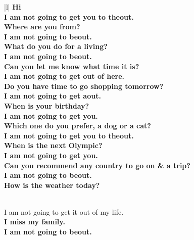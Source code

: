 \documentclass[11pt,a4paper]{article}
\begin{document}
\begin{table}[t!]
\begin{center}
\begin{tabular}{|l|}
\hline \bf 
Hi  \\ 
I am not going to get you to theout.\\
\bf Where are you from?  
\\I am not going to beout.
\\ \bf What do you do for a living?
 \\ I am not going to beout.
\\ \bf Can you let me know what time it is?
 \\I am not going to get out of here.
 \\ \bf Do you have time to go shopping tomorrow?
 \\  I am not going to get aout.
 \\
\bf When is your birthday? \\  
I am not going to get you. \\
\bf Which one do you prefer, a dog or a cat?
\\I am not going to get you to theout. \\
\bf When is the next Olympic?
 \\  I am not going to get you.
 \\
\bf Can you recommend any country to go on & \bf  a trip? 
\\ I am not going to beout.
  \\
\bf How is the weather today?
 
 
 \\  I am not going to get it out of my life.
  \\
\bf I miss my family.
 \\  I am not going to beout.
 \\
\hline
\end{tabular}
\end{center}
\caption{the input and output of chat bot trained with Cornell Movie Corpus}
\end{table}
\end{document}
